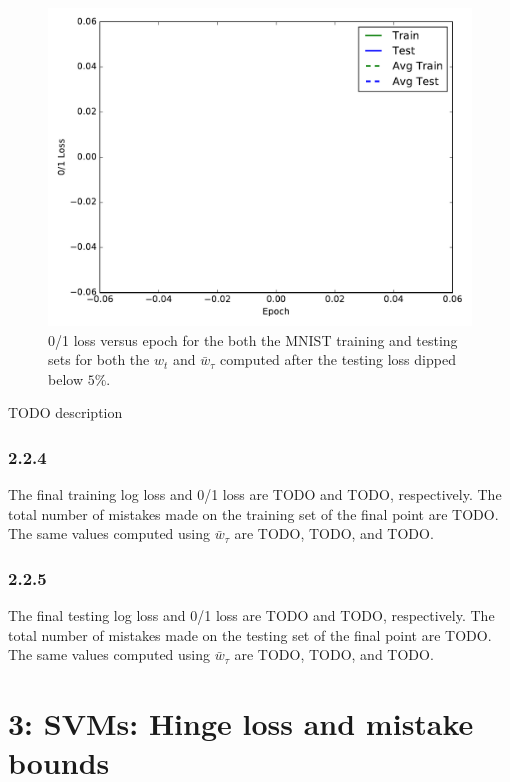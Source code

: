 \documentclass[12pt]{amsart}
\begin{document}
\begin{figure}[H]
	\includegraphics[width=\columnwidth]{logistic_01_loss_masked.pdf}
    \caption{0/1 loss versus epoch for the both the MNIST training and testing sets for both the $w_t$ and $\bar{w}_{\tau}$ computed after the testing loss dipped below $5\%$.}
    \label{fig:logistic_01_loss_masked}
\end{figure}

TODO description

\subsubsection*{2.2.4}

The final training log loss and 0/1 loss are TODO and TODO, respectively.  The total number of mistakes made on the training set of the final point are TODO.  The same values computed using $\bar{w}_{\tau}$ are TODO, TODO, and TODO.

\subsubsection*{2.2.5}

The final testing log loss and 0/1 loss are TODO and TODO, respectively.  The total number of mistakes made on the testing set of the final point are TODO.  The same values computed using $\bar{w}_{\tau}$ are TODO, TODO, and TODO.

\section*{3: SVMs: Hinge loss and mistake bounds}
\end{document}
